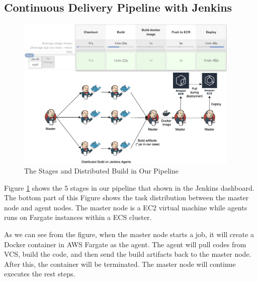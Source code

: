 \subsection{Continuous Delivery Pipeline with Jenkins}
\label{our-ci}
\begin{figure}[h]
    \centering
    \includegraphics[width=0.95\textwidth]{pics/overview.png}
    \caption{The Stages and Distributed Build in Our Pipeline}
    \label{fig:overview}
\end{figure}
Figure \ref{fig:overview} shows the 5 stages in our pipeline that shown in the Jenkins dashboard. The bottom part of this Figure shows the task distribution between the master node and agent nodes. The master node is a EC2 virtual machine while agents runs on Fargate instances within a ECS cluster.
\par
As we can see from the figure, when the master node starts a job, it will create a Docker container in AWS Fargate as the agent. The agent will pull codes from VCS, build the code, and then send the build artifacts back to the master node. After this, the container will be terminated. The master node will continue executes the rest steps.
